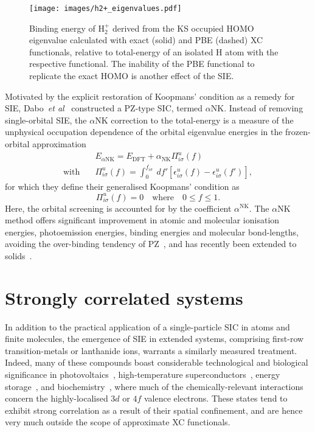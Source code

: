 {\begin{figure}[th!]
\centering
\texttt{[image: images/h2+\_eigenvalues.pdf]}
\caption[Eigenvalue-derived binding energy of H$_2^+$]
{Binding energy of H$_2^+$ 
derived from the KS occupied HOMO eigenvalue 
calculated with exact (solid) and PBE (dashed) XC functionals, 
relative to total-energy of an isolated H atom 
{with the respective functional}.
The inability of the PBE functional to replicate 
the exact HOMO is another effect of the SIE.}
 \label{fig:h2+_eigenvalues}
 \end{figure}

Motivated by the explicit restoration 
of Koopmans' condition 
as a remedy for SIE,  
Dabo~{\it et al}~\cite{PhysRevB.82.115121,PhysRevB.90.075135,PhysRevLett.114.166405,nguyen2017koopmans} 
constructed a PZ-type SIC, 
termed $\alpha$NK.
%
Instead of removing single-orbital SIE, 
the $\alpha$NK correction to the total-energy 
is a measure of the 
unphysical occupation dependence 
of the orbital eigenvalue energies 
in the frozen-orbital approximation
%
\begin{align}
&E_{\alpha\textrm{NK}}=E_\textrm{DFT}+\alpha_\textrm{NK}\Pi_{i\sigma}^u(f) \nonumber \\[0.5em]
\mbox{with}\quad&
\Pi_{i\sigma}^u(f)= \int^{f_{i\sigma}}_0\ df' \left[\epsilon_{i\sigma}^u(f)-\epsilon_{i\sigma}^u(f')\right], 
\end{align}
%
{for which they define their 
generalised Koopmans' condition as 
%
\begin{equation}
\Pi_{i\sigma}^u(f)= 0
\quad\mbox{where}\quad
0\leq f\leq 1.
\end{equation}}
%
Here, the orbital screening is accounted for 
by the coefficient $\alpha^\textrm{NK}$.
%
The $\alpha$NK method 
offers significant improvement 
in atomic and molecular 
ionisation energies, 
photoemission energies, 
binding energies 
and molecular bond-lengths, 
avoiding the over-binding tendency of PZ~\cite{PhysRevB.82.115121}, 
{and has recently been extended 
to solids~\cite{nguyen2017koopmans}.}
%


\section{Strongly correlated systems}
\label{sec:strong_correlation}

In addition to the practical application of 
a single-particle SIC in atoms and finite molecules, 
the emergence of SIE in extended systems, 
comprising first-row transition-metals or lanthanide ions, 
warrants a similarly measured treatment.
%
Indeed, 
many of these compounds 
boast considerable technological and biological significance 
in photovoltaics~\cite{Kasirga2012,PhysRevB.90.165142}, 
high-temperature superconductors~\cite{Dagotto257},
energy storage~\cite{ADMA:ADMA200903328,Zhou2016}, 
and biochemistry~\cite{doi:10.1021/jz3004188,C2CP41836C}, 
where much of the chemically-relevant 
interactions concern the 
highly-localised $3d$ or $4f$ valence electrons.
%
These states tend to exhibit strong correlation 
as a result of their spatial confinement, 
and are hence very much outside the scope  
of approximate XC functionals.

}
